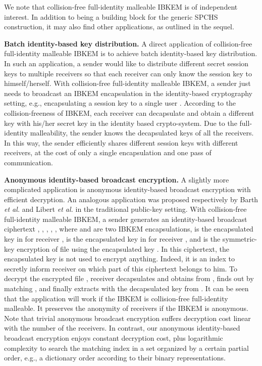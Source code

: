\documentclass[10pt,twocolumn,twoside]{IEEEtran}
\begin{document}
We note that collision-free full-identity malleable IBKEM is of independent interest. In addition to being a building block for the generic SPCHS construction, it may also find other applications, as outlined in the sequel.

\textbf{Batch identity-based key distribution.} A direct application of collision-free full-identity malleable IBKEM is to achieve batch identity-based key distribution. In such an application, a sender would like to distribute different secret session keys to multiple receivers so that each receiver can only know the session key to himself/herself. With collision-free full-identity malleable IBKEM, a sender just needs to broadcast an IBKEM encapsulation in the identity-based cryptography setting, e.g., encapsulating a session key  to a single user . According to the collision-freeness of IBKEM, each receiver  can decapsulate and obtain a different key  with his/her secret key in the identity based crypto-system. Due to the full-identity malleability, the sender knows the decapsulated keys of all the receivers. In this way, the sender efficiently shares different session keys with different receivers, at the cost of only a single encapsulation and one pass of communication.

\textbf{Anonymous identity-based broadcast encryption.}  A slightly more complicated application is anonymous identity-based broadcast encryption with efficient decryption. An analogous application was proposed respectively by Barth \emph{et al.} \cite{BBW06} and Libert \emph{et al.} \cite{LPQ12} in the traditional public-key setting. With collision-free full-identity malleable IBKEM, a sender generates an identity-based broadcast ciphertext , , , , ,  where  and  are two IBKEM encapsulations,  is the encapsulated key in  for receiver ,  is the encapsulated key in  for receiver , and  is the symmetric-key encryption of file  using the encapsulated key . In this ciphertext, the encapsulated key  is not used to encrypt anything. Indeed, it is an index to secretly inform receiver  on which part of this ciphertext belongs to him. To decrypt the encrypted file , receiver  decapsulates and obtains  from , finds out  by matching , and finally extracts  with the decapsulated key  from . It can be seen that the application will work if the IBKEM is collision-free full-identity malleable. It preserves the anonymity of receivers if the IBKEM is anonymous. Note that trivial anonymous broadcast encryption suffers decryption cost linear with the number of the receivers. In contrast, our anonymous identity-based broadcast encryption enjoys constant decryption cost, plus logarithmic complexity to search the matching index in a set  organized by a certain partial order, e.g., a dictionary order according to their binary representations.
\end{document}
